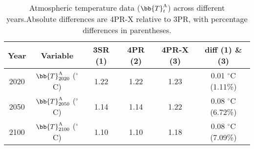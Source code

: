 \begin{table}[ht]
    \centering
    \begin{tabular}{c|c|c|c|c|c}
        \toprule
        Year & Variable & 3SR (1) & 4PR (2) & 4PR-X (3) & diff (1) \& (3) \\
        \midrule
        2020 & $\bb{T}^{\text{A}}_{2020}$ ($^\circ$C) & 1.22 & 1.22 & 1.23 & 0.01 $^\circ$C (1.11\%) \\
        2050 & $\bb{T}^{\text{A}}_{2050}$ ($^\circ$C) & 1.14 & 1.14 & 1.22 & 0.08 $^\circ$C (6.72\%) \\
        2100 & $\bb{T}^{\text{A}}_{2100}$ ($^\circ$C) & 1.10 & 1.10 & 1.18 & 0.08 $^\circ$C (7.09\%) \\
        \bottomrule
    \end{tabular}
     \caption{Atmospheric temperature data ($\bb{{T}}^{{\text{{A}}}}_{t}$) across different years.Absolute differences are 4PR-X relative to 3PR, with percentage differences in parentheses.}
    \label{tab:ccs_data}
\end{table}